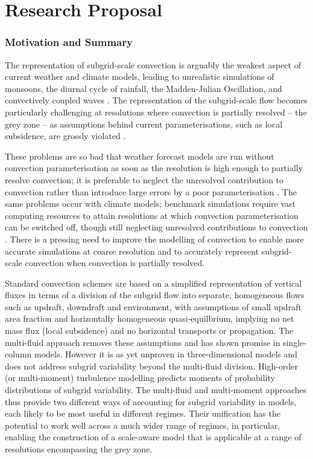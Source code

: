 \documentclass[11pt,a4paper]{article}
\begin{document}


\newpage

\part{Research Proposal}

\section{Motivation and Summary}

The representation of subgrid-scale convection is arguably the weakest aspect of current weather and climate models, leading to unrealistic simulations of monsoons, the diurnal cycle of rainfall, the Madden-Julian Oscillation, and convectively coupled waves  \cite[]{SAB+13,HPB+14}. The representation of the subgrid-scale flow becomes particularly challenging at resolutions where convection is partially resolved -- the grey zone -- as assumptions behind current parameterisations, such as local subsidence, are grossly violated \cite[e.g.][]{GG05}.

These problems are so bad that weather forecast models are run without convection parameterisation as soon as the resolution is high enough to partially resolve convection; it is preferable to neglect the unresolved contribution to convection rather than introduce large errors by a poor parameterisation \cite[]{LCD+08}. The same problems occur with climate models; benchmark simulations require vast computing resources to attain resolutions at which convection parameterisation can be switched off, though still neglecting unresolved contributions to convection \cite[]{SSJ+19}. There is a pressing need to improve the modelling of convection to enable more accurate simulations at coarse resolution and to accurately represent subgrid-scale convection when convection is partially resolved.

Standard convection schemes are based on a simplified representation of vertical fluxes in terms of a division of the subgrid flow into separate, homogeneous flows such as updraft, downdraft and environment, with assumptions of small updraft area fraction and horizontally homogeneous quasi-equilbrium, implying no net mass flux (local subsidence) and no horizontal transports or propagation. The multi-fluid approach removes these assumptions and has shown promise in single-column models. However it is as yet unproven in three-dimensional models and does not address subgrid variability beyond the multi-fluid division. High-order (or multi-moment) turbulence modelling predicts moments of probability distributions of subgrid variability. The multi-fluid and multi-moment approaches thus provide two different ways of accounting for subgrid variability in models, each likely to be most useful in different regimes. Their unification has the potential to work well across a much wider range of regimes, in particular, enabling the construction of a scale-aware model that is applicable at a range of resolutions encompassing the grey zone.
\end{document}
